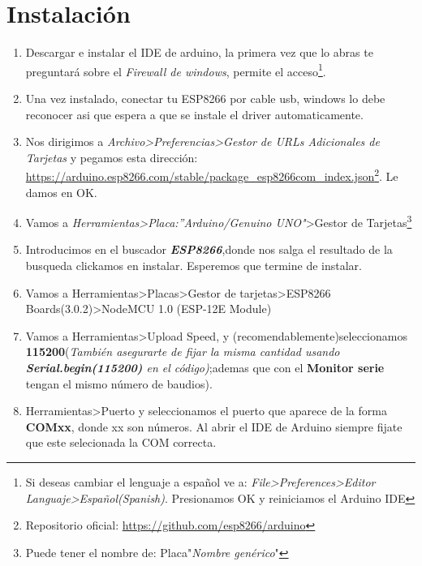 \documentclass[11pt,fleqn]{book} %
\begin{document}
\section{Instalación}
\begin{enumerate}
\item Descargar e instalar el IDE de arduino, la primera vez que lo abras te preguntará sobre el \textit{Firewall de windows}, permite el acceso\footnote{Si deseas cambiar el lenguaje a español ve a: \textit{File>Preferences>Editor Languaje>Español(Spanish)}. Presionamos OK y reiniciamos el Arduino IDE}.
\item Una vez instalado, conectar tu ESP8266 por cable usb, windows lo debe reconocer asi que espera a que se instale el driver automaticamente.
\item Nos dirigimos a \textit{Archivo>Preferencias>Gestor de URLs Adicionales de Tarjetas} y pegamos esta dirección: \url{https://arduino.esp8266.com/stable/package_esp8266com_index.json}\footnote{Repositorio oficial: \url{https://github.com/esp8266/arduino}}. Le damos en OK.
\item Vamos a \textit{Herramientas>Placa:''Arduino/Genuino UNO"}>Gestor de Tarjetas\footnote{Puede tener el nombre de: Placa"\textit{Nombre genérico}"}
\item Introducimos en el buscador \textbf{\textit{ESP8266}},donde nos salga el resultado de la busqueda clickamos en instalar. Esperemos que termine de instalar.
\item Vamos a Herramientas>Placas>Gestor de tarjetas>ESP8266 Boards(3.0.2)>NodeMCU 1.0 (ESP-12E Module)
\item Vamos a Herramientas>Upload Speed, y (recomendablemente)seleccionamos \textbf{115200}(\textit{También asegurarte de fijar la misma cantidad usando \textbf{Serial.begin(115200)}  en el código)};ademas que con el \textbf{Monitor serie} tengan el mismo número de baudios).
\item Herramientas>Puerto y seleccionamos el puerto que aparece de la forma \textbf{COMxx}, donde xx son números. Al abrir el IDE de Arduino siempre fijate que este selecionada la COM correcta.
\end{enumerate}
\end{document}
